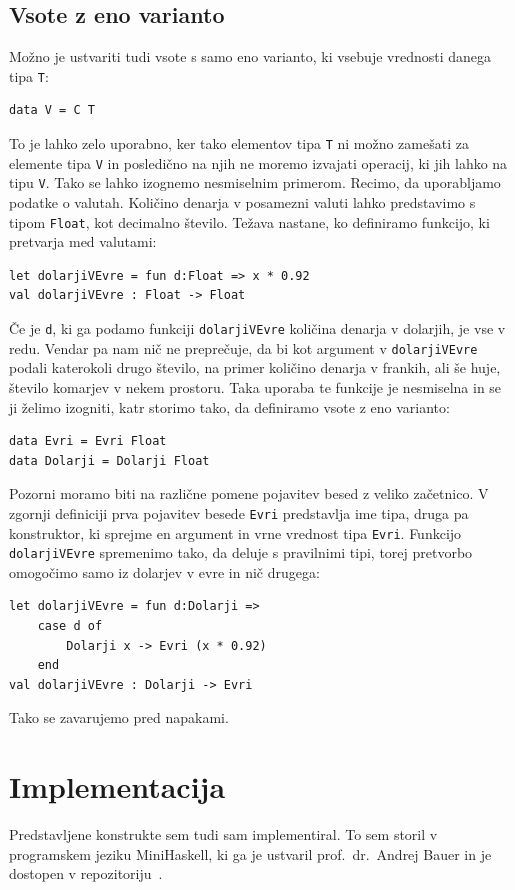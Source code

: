 \documentclass[a4paper,12pt,openright]{book}
\begin{document}
\section{Vsote z eno varianto}
Možno je ustvariti tudi vsote s samo eno varianto, ki vsebuje vrednosti danega tipa \lstinline{T}:
\begin{lstlisting}
data V = C T
\end{lstlisting}
To je lahko zelo uporabno, ker tako elementov tipa \lstinline{T} ni možno zamešati za elemente tipa \lstinline{V} in posledično na njih ne moremo izvajati operacij, ki jih lahko na tipu 
\lstinline{V}. Tako se lahko izognemo nesmiselnim primerom. Recimo, da uporabljamo podatke o valutah. Količino denarja v posamezni valuti lahko predstavimo s tipom \lstinline{Float}, kot decimalno 
število. Težava nastane, ko definiramo funkcijo, ki pretvarja med valutami:
\begin{lstlisting}
let dolarjiVEvre = fun d:Float => x * 0.92
val dolarjiVEvre : Float -> Float
\end{lstlisting}
Če je \lstinline{d}, ki ga podamo funkciji \lstinline{dolarjiVEvre} količina denarja v dolarjih, je vse v redu. Vendar pa nam nič ne 
preprečuje, da bi kot argument v \lstinline{dolarjiVEvre} podali katerokoli drugo število, na primer količino denarja v frankih, ali še huje, število komarjev v nekem prostoru. Taka uporaba te 
funkcije je nesmiselna in se ji želimo izogniti, katr storimo tako, da definiramo vsote z eno varianto:
\begin{lstlisting}
data Evri = Evri Float
data Dolarji = Dolarji Float
\end{lstlisting}
Pozorni moramo biti na različne pomene pojavitev besed z veliko začetnico. V zgornji definiciji prva pojavitev besede \lstinline{Evri} predstavlja ime tipa, druga pa konstruktor, ki sprejme en argument in 
vrne vrednost tipa \lstinline{Evri}.
Funkcijo \lstinline{dolarjiVEvre} spremenimo tako, da deluje s pravilnimi tipi, torej pretvorbo omogočimo 
samo iz dolarjev v evre in nič drugega:
\begin{lstlisting}
let dolarjiVEvre = fun d:Dolarji =>
    case d of 
        Dolarji x -> Evri (x * 0.92)
    end
val dolarjiVEvre : Dolarji -> Evri
\end{lstlisting}
Tako se zavarujemo pred napakami.
\newpage

\chapter{Implementacija}
Predstavljene konstrukte sem tudi sam implementiral. To sem storil v programskem jeziku MiniHaskell, ki ga je ustvaril prof.\ dr.\ Andrej Bauer in 
je dostopen v repozitoriju~\cite{bauer:plzoo}.
\end{document}
